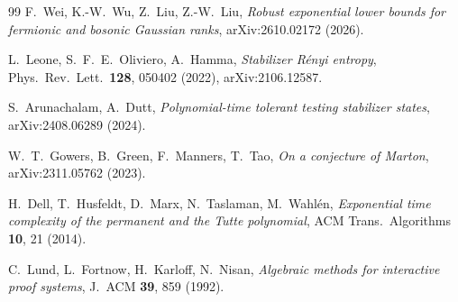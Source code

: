 \begin{thebibliography}{99}
 F.~Wei, K.-W.~Wu, Z.~Liu, Z.-W.~Liu, \emph{Robust exponential lower bounds for fermionic and bosonic Gaussian ranks}, arXiv:2610.02172 (2026).

 L.~Leone, S.~F.~E.~Oliviero, A.~Hamma, \emph{Stabilizer Rényi entropy}, Phys.\ Rev.\ Lett.\ \textbf{128}, 050402 (2022), arXiv:2106.12587.

 S.~Arunachalam, A.~Dutt, \emph{Polynomial-time tolerant testing stabilizer states}, arXiv:2408.06289 (2024).

 W.~T.~Gowers, B.~Green, F.~Manners, T.~Tao, \emph{On a conjecture of Marton}, arXiv:2311.05762 (2023).

 H.~Dell, T.~Husfeldt, D.~Marx, N.~Taslaman, M.~Wahlén, \emph{Exponential time complexity of the permanent and the Tutte polynomial}, ACM Trans.\ Algorithms \textbf{10}, 21 (2014).

 C.~Lund, L.~Fortnow, H.~Karloff, N.~Nisan, \emph{Algebraic methods for interactive proof systems}, J.\ ACM \textbf{39}, 859 (1992).

\end{thebibliography}
